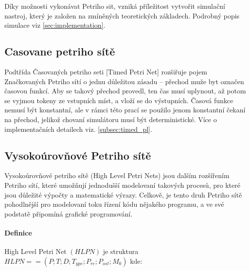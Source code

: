 Díky možnosti vykonávat Petriho sit, vzniká příležitost vytvořit simulační nastroj, který je založen na zmíněných teoretických základech. Podrobný popis simulace viz \ref{sec:implementation}.

\subsection{Casovane petriho sítě}
Podtřída Časovaných petriho seti [Timed Petri Net] rozšiřuje pojem Značkovaných Petriho sítí o jednu důležitou zásadu -- přechod muže byt označen časovou funkcí. Aby se takový přechod provedl, ten čas musí uplynout, až potom se vyjmou tokeny ze vstupních míst, a vloží se do výstupních. Časová funkce nemusí být konstantní, ale v rámci této prací se použilo jenom konstantní čekaní na přechod, jelikož chovaní simulátoru musí být deterministické. Více o implementačních detailech viz. \ref{subsec:timed_pl}.

\subsection{Vysokoúrovňové Petriho sítě}
Vysokoúrovňové petriho sítě (High Level Petri Nets) jsou dalším rozšířením Petriho sítí, které umožňují jednodušší modelovaní takových procesů, pro které jsou důležité výpočty a matematické výrazy. Celkově, je tento druh Petriho sítě pohodlnější pro modelovaní toku řízení kódu nějakého programu, a ve své podstatě připomíná grafické programování.

\paragraph{Definice}

High Level Petri Net $(HLPN)$ je struktura $HLPN == \left( P; T; D; T_{ype}; P_{re}; P_{ost}; M_0\right) $ kde:

